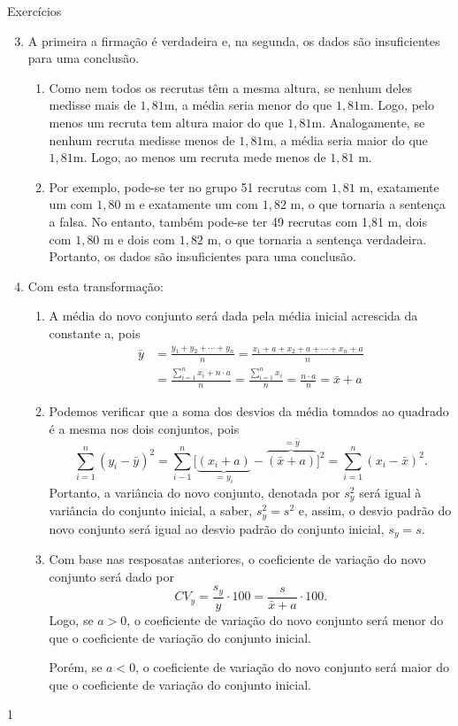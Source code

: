 \begin{answer}{Exercícios}
{\exerciselist
  \begin{enumerate}\setcounter{enumi}{2}
  \item A primeira a firmação é verdadeira e, na segunda, os dados são insuficientes para uma conclusão.
  \begin{enumerate}
  \item Como nem todos os recrutas têm a mesma altura, se nenhum deles medisse mais de $1{,}81$m, a média seria menor do que $1{,}81$m. Logo, pelo menos um recruta tem altura maior do que $1{,}81$m. Analogamente, se nenhum recruta medisse menos de $1{,}81$m, a média seria maior do que $1{,}81$m. Logo, ao menos um recruta mede menos de $1{,}81$ m.

  \item Por exemplo, pode-se ter no grupo 51 recrutas com $1{,}81$ m, exatamente um com $1{,}80$ m e exatamente um com $1{,}82$ m, o que tornaria a sentença a falsa. No entanto, também pode-se ter 49 recrutas com 1{,}81 m, dois com $1{,}80$ m e dois com $1{,}82$ m, o que tornaria a sentença verdadeira. Portanto, os dados são insuficientes para uma conclusão.
  \end{enumerate}
  \item Com esta transformação:
  \begin{enumerate}
  \item A média do novo conjunto será dada pela média inicial acrescida da constante a, pois
  \begin{align*}
  \bar{y}&=\frac{y_1+y_2+\cdots+y_n}{n}=\frac{x_1+a+x_2+a+\cdots+x_n+a}{n}\\
  &=\frac{\sum_{i=1}^{n}x_i+n\cdot a}{n}=\frac{\sum^n_{i=1}x_i}{n}=\frac{n\cdot a}{n}=\bar{x}+a
  \end{align*}
  \item Podemos verificar que a soma dos desvios da média tomados ao quadrado é a mesma nos dois conjuntos, pois
  \begin{equation*}
  \sum^n_{i=1}(y_i-\bar{y})^2=\sum^n_{i-1}\big[\underbrace{(x_i+a)}_{=y_i}-\overbrace{(\bar{x}+a)}^{=\bar{y}}\big]^2=\sum^n_{i=1}(x_i-\bar{x})^2.
  \end{equation*}
  Portanto, a variância do novo conjunto, denotada por $s^2_y$ será igual à variância do conjunto inicial, a saber, $s^2_y=s^2$ e, assim, o desvio padrão do novo conjunto será igual ao desvio padrão do conjunto inicial, $s_y=s$.
  \item Com base nas resposatas anteriores, o coeficiente de variação do novo conjunto será dado por 
  \begin{equation*}
  CV_y=\frac{s_y}{y}\cdot100=\frac{s}{\bar{x}+a}\cdot100.
  \end{equation*}
  Logo, se $a>0$, o coeficiente de variação do novo conjunto será menor do que o coeficiente de variação do conjunto inicial. 

  Porém, se $a<0$, o coeficiente de variação do novo conjunto será maior do que o coeficiente de variação do conjunto inicial.
  \end{enumerate}
  \end{enumerate}
}{1}
\end{answer}
